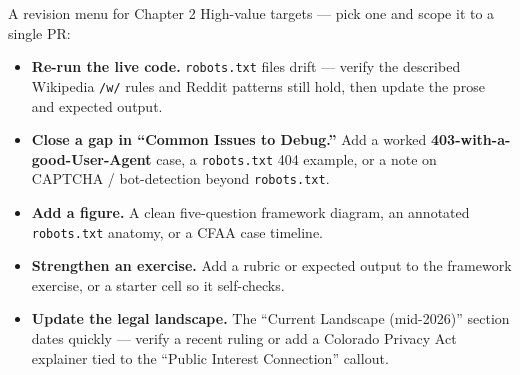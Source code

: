 \documentclass[9pt,aspectratio=169]{beamer}
\begin{document}
\begin{frame}{A revision menu for Chapter 2}
    High-value targets --- pick one and scope it to a single PR:
    \begin{itemize}
        \item \textbf{Re-run the live code.} \texttt{robots.txt} files drift --- verify the described Wikipedia \texttt{/w/} rules and Reddit patterns still hold, then update the prose and expected output.
        \item \textbf{Close a gap in ``Common Issues to Debug.''} Add a worked \textbf{403-with-a-good-User-Agent} case, a \texttt{robots.txt} 404 example, or a note on CAPTCHA / bot-detection beyond \texttt{robots.txt}.
        \item \textbf{Add a figure.} A clean five-question framework diagram, an annotated \texttt{robots.txt} anatomy, or a CFAA case timeline.
        \item \textbf{Strengthen an exercise.} Add a rubric or expected output to the framework exercise, or a starter cell so it self-checks.
        \item \textbf{Update the legal landscape.} The ``Current Landscape (mid-2026)'' section dates quickly --- verify a recent ruling or add a Colorado Privacy Act explainer tied to the ``Public Interest Connection'' callout.
    \end{itemize}
\end{frame}
\end{document}
